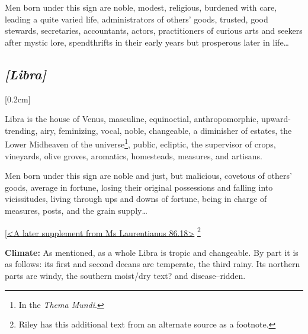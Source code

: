 Men born under this sign are noble, modest, religious, burdened with care, leading a quite varied life, administrators of others’ goods, trusted, good stewards, secretaries, accountants, actors, practitioners of curious arts and seekers after mystic lore, spendthrifts in their early years but prosperous later in life\ldots 

\secbr
\subsection{\textit{[Libra]}}
[0.2cm]

Libra is the house of Venus, masculine, equinoctial, anthropomorphic, upward-trending, airy, feminizing, vocal, noble, changeable, a diminisher of estates, the Lower Midheaven of the universe\footnote{In the \textit{Thema Mundi}.}, public, ecliptic, the supervisor of crops, vineyards, olive groves, aromatics, homesteads, measures, and artisans.

Men born under this sign are noble and just, but malicious, covetous of others’ goods, average in fortune, losing their original possessions and falling into vicissitudes, living through ups and downs of fortune, being in charge of measures, posts, and the grain supply\ldots

\noindent
[\underline{<A later supplement from Ms Laurentianus 86.18>}
\footnote{Riley has this additional text from an alternate source as a footnote.}  

\textbf{Climate:} As mentioned, as a whole Libra is tropic and changeable. By part it is as follows: its first and second decans are temperate, the third rainy. Its northern
parts are windy, the southern moist/dry text? and disease–ridden. 

